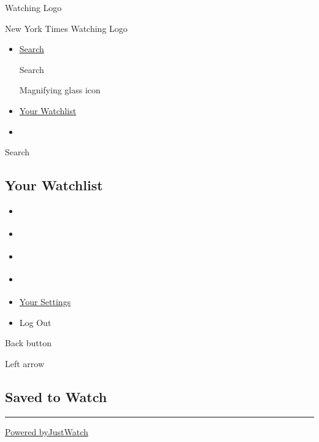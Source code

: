 \href{/watching}{}

Watching Logo

New York Times Watching Logo

\begin{itemize}
\item
  \href{/watching/search}{Search}

  Search

  Magnifying glass icon
\item
  \href{/watching/watchlist}{Your Watchlist}
\item
\end{itemize}

Search

\hypertarget{your-watchlist}{%
\subsection{Your Watchlist}\label{your-watchlist}}

\begin{itemize}
\tightlist
\item
  \href{/watching/watchlist/foryou}{}
\end{itemize}

\begin{itemize}
\tightlist
\item
  \href{/watching/watchlist}{}
\item
  \href{/watching/watchlist/liked}{}
\item
  \href{/watching/watchlist/watched}{}
\end{itemize}

\begin{itemize}
\tightlist
\item
  \href{/watching/settings}{Your Settings}
\item
  Log Out
\end{itemize}

Back button

Left arrow

\hypertarget{saved-to-watch}{%
\subsection{Saved to Watch}\label{saved-to-watch}}

\begin{center}\rule{0.5\linewidth}{\linethickness}\end{center}

\href{https://www.gowatchit.com}{Powered byJustWatch}

